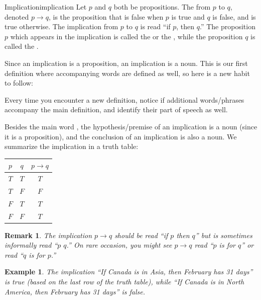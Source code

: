 \documentclass{book}
\newcounter{ekcounter}%
\theoremstyle{ekimcustom}
\newtheorem{example}[ekcounter]{Example}
\newtheorem{remark}[ekcounter]{Remark}
\newcommand\defn[1]{{\color{blue}{\bf #1}}}
\begin{document}
\begin{bdefinition}{Implication}{implication}
Let $p$ and $q$ both be propositions. The \defn{implication} from $p$ to $q$, denoted $p \rightarrow q$, is the proposition that is false when $p$ is true and $q$ is false, and is true otherwise. The implication from $p$ to $q$ is read ``if $p$, then $q$.''
\vskip6pt
The proposition $p$ which appears in the implication is called the \defn{hypothesis} or the 
\defn{premise}, while the proposition $q$ is called the \defn{conclusion}.
\end{bdefinition}
Since an implication is a proposition, an implication is a noun. This is our first definition where accompanying words are defined as well, so here is a new habit to follow:
\begin{bhabit}{}{}
Every time you encounter a new definition, notice if additional words/phrases accompany the main definition, and identify their part of speech as well.
\end{bhabit}
Besides the main word \defn{implication}, the hypothesis/premise of an implication is a noun (since it is a proposition), and the conclusion of an implication is also a noun. We summarize the implication in a truth table:
\begin{center}
\begin{tabular}{c|c||c}
$p$ & $q$ & $p \rightarrow q$ \\\hline
$T$ & $T$ & $T$\\
$T$ & $F$ & $F$\\
$F$ & $T$ & $T$\\
$F$ & $F$ & $T$
\end{tabular}
\end{center}

\begin{remark}
The implication $p \to q$ should be read ``if $p$ then $q$'' but is sometimes informally read ``$p$ \defn{implies} $q$.'' On rare occasion, you might see $p \to q$ read ``$p$ is \defn{sufficient} for $q$'' or read ``$q$ is \defn{necessary} for $p$.''
\end{remark}


\begin{example}
The implication ``If Canada is in Asia, then February has 31 days'' is true (based on the last row of the truth table), while ``If Canada is in North America, then February has 31 days'' is false.
\end{example}
\end{document}
